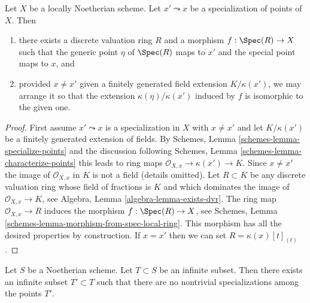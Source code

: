 \begin{lemma}
\label{lemma-locally-Noetherian-specialization-dvr}
Let $X$ be a locally Noetherian scheme.
Let $x' \leadsto x$ be a specialization of points of $X$. Then
\begin{enumerate}
\item there exists a discrete valuation ring $R$ and a morphism
$f : \Spec(R) \to X$ such that the generic point $\eta$ of
$\Spec(R)$ maps to $x'$ and the special point maps to $x$, and
\item provided $x \not = x'$ given a finitely generated field
extension $K/\kappa(x')$, we may arrange it so that the extension
$\kappa(\eta)/\kappa(x')$
induced by $f$ is isomorphic to the given one.
\end{enumerate}
\end{lemma}

\begin{proof}
First assume $x' \leadsto x$ is a specialization in $X$
with $x \not = x'$ and let $K/\kappa(x')$ be a finitely
generated extension of fields. By
Schemes, Lemma \ref{schemes-lemma-specialize-points}
and the discussion following
Schemes, Lemma \ref{schemes-lemma-characterize-points}
this leads to ring maps $\mathcal{O}_{X, x} \to \kappa(x') \to K$.
Since $x \not = x'$ the image of $\mathcal{O}_{X, x}$ in $K$
is not a field (details omitted).
Let $R \subset K$ be any discrete valuation ring whose field of fractions is
$K$ and which dominates the image of $\mathcal{O}_{X, x} \to K$, see
Algebra, Lemma \ref{algebra-lemma-exists-dvr}.
The ring map $\mathcal{O}_{X, x} \to R$ induces the morphism
$f : \Spec(R) \to X$, see
Schemes, Lemma \ref{schemes-lemma-morphism-from-spec-local-ring}.
This morphism has all the desired properties by construction.
If $x = x'$ then we can set $R = \kappa(x)[t]_{(t)}$.
\end{proof}

\begin{lemma}
\label{lemma-thin-infinite-sequence}
Let $S$ be a Noetherian scheme. Let $T \subset S$ be an infinite subset.
Then there exists an infinite subset $T' \subset T$
such that there are no nontrivial specializations among the points $T'$.
\end{lemma}

